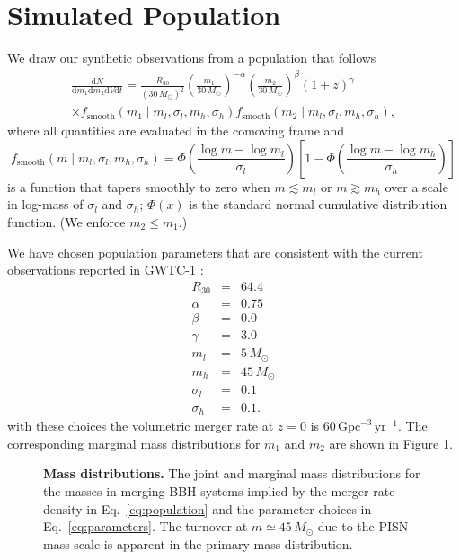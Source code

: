 \documentclass[modern]{aastex62}
\newcommand{\dd}{\mathrm{d}}
\newcommand{\diff}[2]{\frac{\dd #1}{\dd #2}}
\newcommand{\fsm}{f_{\mathrm{smooth}}}
\newcommand{\MPISN}{45 \, \MSun{}}
\newcommand{\MSun}{M_\odot}
\newcommand{\perGpcyr}{\mathrm{Gpc}^{-3} \, \mathrm{yr}^{-1}}
\begin{document}
\section{Simulated Population}
\label{sec:simulated-population}

We draw our synthetic observations from a population that follows
%
\begin{multline}
  \label{eq:population}
  \diff{N}{m_1 \dd m_2 \dd V \dd t} = \frac{R_{30}}{\left( 30 \, \MSun \right)^2} \left( \frac{m_1}{30 \, \MSun} \right)^{-\alpha} \left( \frac{m_2}{30 \, \MSun} \right)^{\beta} \left( 1 + z \right)^{\gamma} \\ \times \fsm\left( m_1 \mid m_l, \sigma_l, m_h, \sigma_h \right) \fsm\left( m_2 \mid m_l, \sigma_l, m_h, \sigma_h \right),
\end{multline}
%
where all quantities are evaluated in the comoving frame and
%
\begin{equation}
  \label{eq:smooth}
  \fsm\left( m \mid m_l, \sigma_l, m_h, \sigma_h \right) = \Phi\left( \frac{\log m - \log m_l}{\sigma_l} \right) \left[ 1 - \Phi\left( \frac{\log m - \log m_h}{\sigma_h} \right) \right]
\end{equation}
%
is a function that tapers smoothly to zero when $m \lesssim m_l$ or $m \gtrsim
m_h$ over a scale in log-mass of $\sigma_l$ and $\sigma_h$; $\Phi(x)$ is the
standard normal cumulative distribution function.  (We enforce $m_2 \leq m_1$.)

We have chosen population parameters that are consistent with the current
observations reported in GWTC-1 \citep{GWTC-1,O1O2Population}:
%
\begin{eqnarray}
  \label{eq:parameters}
  R_{30} & = & 64.4 \\
  \alpha & = & 0.75 \\
  \beta & = & 0.0 \\
  \gamma & = & 3.0 \\
  m_l & = & 5 \, \MSun \\
  m_h & = & 45 \, \MSun \\
  \sigma_l & = & 0.1 \\
  \sigma_h & = & 0.1.
\end{eqnarray}
%
with these choices the volumetric merger rate at $z = 0$ is $60 \, \perGpcyr$.
The corresponding marginal mass distributions for $m_1$ and $m_2$ are shown in
Figure \ref{fig:marginal-masses}.

\begin{figure}
%
  \caption{\label{fig:marginal-masses} \textbf{Mass distributions.} The joint
  and  marginal mass distributions for the masses in merging \ac{BBH} systems
  implied by the merger rate density in Eq.\ \eqref{eq:population} and the
  parameter choices in Eq.\ \eqref{eq:parameters}. The turnover at $m \simeq
  \MPISN{}$ due to the \ac{PISN} mass scale is apparent in the primary mass
  distribution.}
%
\end{figure}
\end{document}
